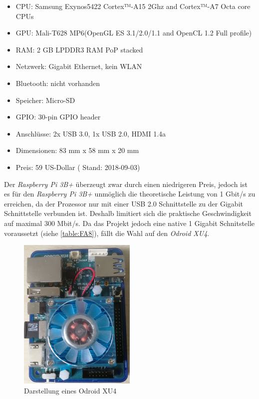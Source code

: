 \documentclass[titlepage]{report}
\begin{document}
\begin{itemize}
    \item CPU: Samsung Exynos5422 Cortex™-A15 2Ghz and Cortex™-A7 Octa core CPUs
    \item GPU: Mali-T628 MP6(OpenGL ES 3.1/2.0/1.1 and OpenCL 1.2 Full profile)
    \item RAM: 2 GB LPDDR3 RAM PoP stacked
    \item Netzwerk: Gigabit Ethernet, kein WLAN
    \item Bluetooth: nicht vorhanden
    \item Speicher: Micro-SD
    \item GPIO: 30-pin GPIO header\cite{ODROID_GPIO}
    \item Anschlüsse: 2x USB 3.0, 1x USB 2.0, HDMI 1.4a
    \item Dimensionen: 83 mm x 58 mm x 20 mm
    \item Preis: 59 US\hyp{}Dollar\cite{ODROID_PRICE} ( Stand: 2018-09-03)
\end{itemize}
Der \emph{Raspberry Pi 3B+} überzeugt zwar durch einen niedrigeren
Preis, jedoch ist es für den \emph{Raspberry Pi 3B+} unmöglich die
theoretische Leistung von 1 Gbit/s zu erreichen, da der Prozessor nur
mit einer USB 2.0 Schnittstelle zu der Gigabit Schnittstelle verbunden
ist. Deshalb limitiert sich die praktische Geschwindigkeit auf maximal
300 Mbit/s\cite{RASPI}. Da das Projekt jedoch eine native 1 Gigabit
Schnitstelle voraussetzt (siehe \autoref{table:FA8}), fällt die Wahl auf
den \emph{Odroid XU4}.
\begin{figure}[H]
    \centering
    \includegraphics[width=0.5\textwidth]{figures/odroid.jpg}
    \caption{Darstellung eines Odroid XU4}\label{fig:odroid}
\end{figure}
\end{document}
